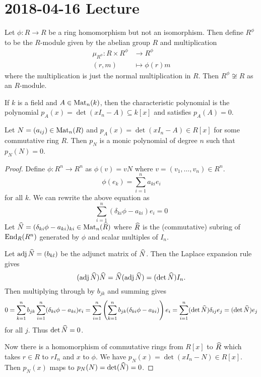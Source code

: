 \section{2018-04-16 Lecture}

\begin{exam}
	Let $\phi:R \to R$ be a ring homomorphism but not an isomorphism.
	Then define $R^\phi$ to be the $R$-module given by the abelian group $R$ and multiplication
	\begin{align*}
		\mu_{R^\phi}: R \times R^\phi &\to R^\phi \\
		(r,m) &\mapsto \phi(r)m
	\end{align*}
	where the multiplication is just the normal multiplication in $R$.
	Then $R^\phi \not\cong R$ as an $R$-module.
\end{exam}

If $k$ is a field and $A \in \operatorname{Mat}_n(k)$, then the characteristic polynomial is the polynomial $p_A(x) = \det(xI_n-A) \subseteq k[x]$ and satisfies $p_A(A)=0$.

\begin{thm}
	Let $N = (a_{ij}) \in \operatorname{Mat}_n(R)$ and $p_A(x) = \det(xI_n-A) \in R[x]$ for some commutative ring $R$.
	Then $p_N$ is a monic polynomial of degree $n$ such that $p_N(N)=0$.
\end{thm}

\begin{proof}
	Define $\phi: R^n \to R^n$ as $\phi(v)=vN$ where $v=(v_1,\ldots,v_n) \in R^n$.
	\[\phi(e_k) = \sum_{i=1}^n a_{ki}e_i\]
	for all $k$.
	We can rewrite the above equation as
	\[\sum_{i=1}^n (\delta_{ki}\phi-a_{ki})e_i=0\]
	Let $\widehat{N}=(\delta_{ki}\phi-a_{ki})_{ki} \in \operatorname{Mat}_n(\widehat R)$ where $\widehat R$ is the (commutative) subring of $\operatorname{End}_R(R^n)$ generated by $\phi$ and scalar multiples of $I_n$.

	Let $\operatorname{adj} \widehat N = (b_{kl})$ be the adjunct matrix of $\widehat N$.
	Then the Laplace expansion rule gives
	\[ (\operatorname{adj}\widehat N)\widehat N = \widehat N(\operatorname{adj}\widehat N) = (\det\widehat N) I_n.\]
	Then multiplying through by $b_{jk}$ and summing gives
	\[0 = \sum_{k=1}^n b_{jk} \sum_{i=1}^n (\delta_{ki}\phi-a_{ki})e_i = \sum_{i=1}^n \left( \sum_{k=1}^n b_{jk}(\delta_{ki}\phi-a_{ki})\right)e_i = \sum_{i=1}^n (\det \widehat N)\delta_{ij} e_j = (\det \widehat N)e_j\]
	for all $j$.
	Thus $\det \widehat N=0$.
	
	Now there is a homomorphism of commutative rings from $R[x]$ to $\widehat R$ which takes $r \in R$ to $rI_n$ and $x$ to $\phi$.
	We have $p_N(x) = \det(xI_n-N) \in R[x]$.
	Then $p_N(x)$ maps to $p_N(N) = \det (\widehat N) = 0$.
\end{proof}

